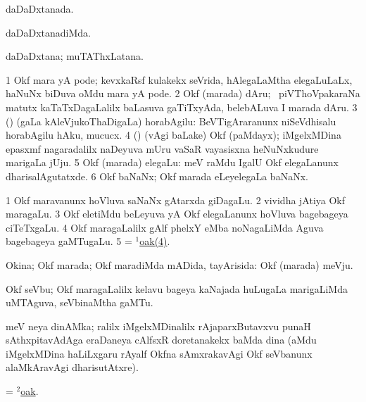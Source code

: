 \bentry
{}
\gl{\gu}
\bmng
daDaDxtanada. 
\emng
\eentry

\bentry
{}
\gl{\kirxvi}
\bmng
daDaDxtanadiMda. 
\emng
\eentry

\bentry
{}
\gl{\nA}
\bmng
daDaDxtana; muTAThxLatana. 
\emng
\eentry

\bentry
{}
\gl{\nA}
\bmng
\bnum
\num{1} Okf mara yA pode; kevxkaRsf kulakekx seVrida, hAlegaLaMtha elegaLuLaLx, haNuNx biDuva oMdu mara yA pode. 
\num{2} Okf (marada) dAru; \kanmu\ piVThoVpakaraNa matutx kaTaTxDagaLalilx baLasuva gaTiTxyAda, belebALuva I marada dAru. 
\num{3} (\birx) (\vivi gaLa kAleVjukoThaDigaLa) horabAgilu:  BeVTigAraranunx niSeVdhisalu horabAgilu hAku, mucucx. 
\hypertarget{oak(1)4}{} 
\num{4} () (\Eva vAgi baLake) Okf (paMdayx); iMgelxMDina epasxmf nagaradalilx naDeyuva mUru vaSaR vayasisxna heNuNxkudure marigaLa jUju. 
\num{5} Okf (marada) elegaLu:  meV raMdu IgalU Okf elegaLanunx dharisalAgutatxde. 
\num{6} Okf baNaNx; Okf marada eLeyelegaLa baNaNx. 
\enum
\emng

\noindent
\gl{\pagu}
\bmng
\bnum
\num{1}  Okf maravanunx hoVluva saNaNx gAtarxda giDagaLu. 
\num{2}  vividha jAtiya Okf maragaLu. 
\num{3}  Okf eletiMdu beLeyuva yA Okf elegaLanunx hoVluva bagebageya ciTeTxgaLu. 
\num{4}  Okf maragaLalilx gAlf phelxY eMba noNagaLiMda Aguva bagebageya gaMTugaLu. 
\num{5}  = \hyperlink{oak(1)4}{$^1$oak(4)}. 
\enum
\emng
\eentry

\bentry
{}
\gl{\gu}
\bmng
Okina; Okf marada; Okf maradiMda mADida, tayArisida:  Okf (marada) meVju. 
\emng
\eentry

\bentry
{}
\gl{\nA}
\bmng
Okf seVbu; Okf maragaLalilx kelavu bageya kaNajada huLugaLa marigaLiMda uMTAguva, seVbinaMtha gaMTu. 
\emng

\noindent
\gl{\pagu}
\bmng
{} meV neya dinAMka; ralilx iMgelxMDinalilx rAjaparxButavxvu punaH sAthxpitavAdAga eraDaneya cAlfsxR doretanakekx baMda dina (aMdu iMgelxMDina haLiLxgaru rAyalf Okfna sAmxrakavAgi Okf seVbanunx alaMkAravAgi dharisutAtxre). 
\emng
\eentry

\bentry
{}
\gl{\gu}
\bmng
= \hyperlink{oak(2)}{$^2$oak}. 
\emng
\eentry

